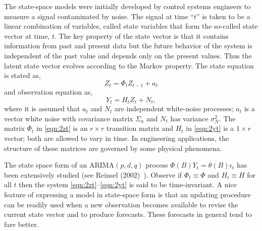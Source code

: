 The state-space models were initially developed by control systems engineers to measure a signal contaminated by noise.\label{in:state_space} The signal at time ``$t$'' is taken to be a linear combination of variables, called state variables that form the so-called state vector at time, $t$. The key property of the state vector is that it contains information from past and present data but the future behavior of the system is independent of the past value and depends only on the present values. Thus the latent state vector evolves according to the Markov property. The state equation is stated as,
	\begin{equation} \label{eqn:2zt}
	Z_t = \Phi_tZ_{t-1} + a_t
	\end{equation}
and observation equation as,
	\begin{equation} \label{eqn:2yt}
	Y_t = H_tZ_t + N_t,
	\end{equation}
where it is assumed that $a_t$ and $N_t$ are independent white-noise processes; $a_t$ is a vector white noise with covariance matrix $\Sigma_a$ and $N_t$ has variance $\sigma_N^2$. The matrix $\Phi_t$ in \eqref{eqn:2zt} is an $r \times r$ transition matrix and $H_t$ in \eqref{eqn:2yt} is a $1 \times r$ vector; both are allowed to vary in time. In engineering applications, the structure of these matrices are governed by some physical phenomena. 


The state space form of an ARIMA$(p,d,q)$ process $\Phi(B)Y_t= \theta(B)\epsilon_t$ has been extensively studied (see Reinsel (2002)~\cite[Section~2.6]{2002reinsel}). Observe if $\Phi_t \equiv \Phi$ and $H_t \equiv H$ for all $t$ then the system \eqref{eqn:2zt}--\eqref{eqn:2yt} is said to be time-invariant. A nice feature of expressing a model in state-space form is that an updating procedure can be readily used when a new observation becomes available to revise the current state vector and to produce forecasts. These forecasts in general tend to fare better. 


